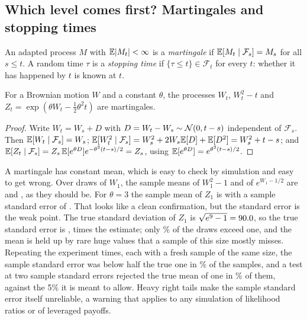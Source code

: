 \begin{chapterrefs}
\FloatBarrier
\section{Which level comes first? Martingales and stopping times}
\label{sec3:mart}

\begin{definition}\label{def3:mart}
An adapted process $M$ with $\mathbb{E}|M_t|<\infty$ is a \emph{martingale} if $\mathbb{E}[M_t\mid\mathcal F_s]=M_s$ for
all $s\le t$. A random time $\tau$ is a \emph{stopping time} if $\{\tau\le t\}\in\mathcal F_t$ for every
$t$: whether it has happened by $t$ is known at $t$.
\end{definition}

\begin{proposition}\label{prop3:martingales}
For a Brownian motion $W$ and a constant $\theta$, the processes $W_t$, $W_t^2-t$ and
$Z_t=\exp(\theta W_t-\tfrac12\theta^2t)$ are martingales.
\end{proposition}

\begin{proof}
Write $W_t=W_s+D$ with $D=W_t-W_s\sim\mathcal{N}(0,t-s)$ independent of $\mathcal F_s$. Then
$\mathbb{E}[W_t\mid\mathcal F_s]=W_s$; $\mathbb{E}[W_t^2\mid\mathcal F_s]=W_s^2+2W_s\mathbb{E}[D]+\mathbb{E}[D^2]=W_s^2+t-s$; and
$\mathbb{E}[Z_t\mid\mathcal F_s]=Z_s\,\mathbb{E}[e^{\theta D}]e^{-\theta^2(t-s)/2}=Z_s$, using
$\mathbb{E}[e^{\theta D}]=e^{\theta^2(t-s)/2}$.
\end{proof}

A martingale has constant mean, which is easy to check by simulation and easy to get wrong. Over
\mgPaths{} draws of $W_1$, the sample means of $W_1^2-1$ and of $e^{W_1-1/2}$ are \mgSq{} and \mgExp, as
they should be. For $\theta=3$ the sample mean of $Z_1$ is \mgExpThree{} with a sample standard error of
\mgExpThreeSE. That looks like a clean confirmation, but the standard error is the weak point. The true
standard deviation of $Z_1$ is $\sqrt{e^9-1}=90.0$, so the true standard error is
\mgExpThreeTrueSE, \mgSERatio{} times the estimate; only \mgExpThreeShare\% of the draws exceed one, and
the mean is held up by rare huge values that a sample of this size mostly misses. Repeating the
experiment \mgReps{} times, each with a fresh sample of the same size, the sample standard error was
below half the true one in \mgSEHalfShare\% of the samples, and a test at two sample standard errors
rejected the true mean of one in \mgRejShare\% of them, against the 5\% it is meant to allow. Heavy
right tails make the sample standard error itself unreliable, a warning that applies to any
simulation of likelihood ratios or of leveraged payoffs.


\end{chapterrefs}
